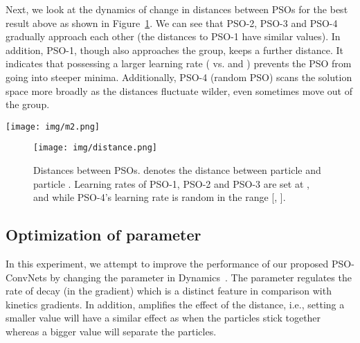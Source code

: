 \documentclass{ieeeaccess}
\begin{document}
Next, we look at the dynamics of change in distances between PSOs for the best result above as shown in Figure~\ref{fig:distance}. We can see that PSO-2, PSO-3 and PSO-4 gradually approach each other (the distances to PSO-1 have similar values). In addition, PSO-1, though also approaches the group, keeps a further distance. It indicates that possessing a larger learning rate ( vs.  and ) prevents the PSO from going into steeper minima. Additionally, PSO-4 (random PSO) scans the solution space more broadly as the distances fluctuate wilder, even sometimes move out of the group.
\begin{figure*}[htb!]
\begin{center}
\texttt{[image: img/m2.png]}
\caption{Results on variation of  and . The weight  from all particles toward wilder particles is set at a higher value. The best accuracy is recorded for all PSOs in each experiment.}
\label{fig:m2}
\end{center}
\end{figure*}
\begin{figure}[htb!]
\begin{center}
\texttt{[image: img/distance.png]}
\caption{Distances between PSOs.  denotes the distance between particle  and particle . Learning rates of PSO-1, PSO-2 and PSO-3 are set at ,  and  while PSO-4's learning rate is random in the range [, ].}
\label{fig:distance}
\end{center}
\end{figure}
\subsection{Optimization of parameter }
\label{sec:beta}
In this experiment, we attempt to improve the performance of our proposed PSO-ConvNets by changing the parameter  in Dynamics~. The parameter regulates the rate of decay (in the gradient) which is a distinct feature in comparison with kinetics gradients. In addition,  amplifies the effect of the distance, i.e., setting a smaller value will have a similar effect as when the particles stick together whereas a bigger value will separate the particles.
\end{document}
